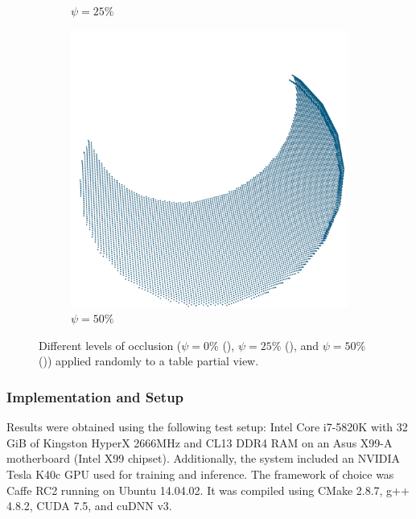 \begin{figure}[!t]
\begin{subfigure}{0.32\textwidth}
		\caption{$\psi=25\%$}
		\label{subfig:objrecog:occlusion:25}
	\end{subfigure}
	\hfill
	\begin{subfigure}{0.32\textwidth}
		\centering
		\includegraphics[width=\linewidth]{Figures/ObjRecog/occlusion_50}
		\caption{$\psi=50\%$}
		\label{subfig:objrecog:occlusion:50}
	\end{subfigure}
	\hfill
	\caption{Different levels of occlusion ($\psi=0\%$ (), $\psi=25\%$ (), and $\psi=50\%$ ()) applied randomly to a table partial view.}
	\label{fig:objrecog:occlusion}
\end{figure}

\subsubsection{Implementation and Setup}
\label{cha:objrecog:sec:study:subsec:experiments:subsubsec:setup}


Results were obtained using the following test setup: Intel Core i7-5820K with 32 GiB of Kingston HyperX 2666MHz and CL13 DDR4 RAM on an Asus X99-A motherboard (Intel X99 chipset). Additionally, the system included an NVIDIA Tesla K40c GPU used for training and inference. The framework of choice was Caffe RC2 running on Ubuntu 14.04.02. It was compiled using CMake 2.8.7, g++ 4.8.2, CUDA 7.5, and cuDNN v3.

